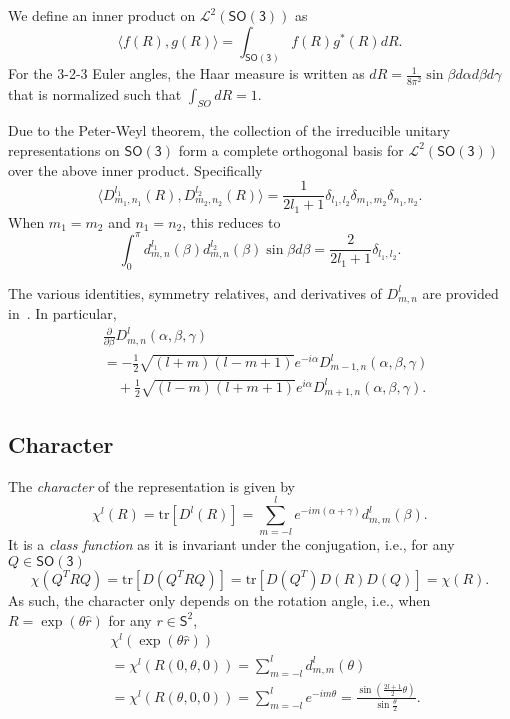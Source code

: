 \documentclass{ieeetran}
\newcommand{\pair}[1]{\ensuremath{\langle #1 \rangle}}
\newcommand{\trs}[1]{\mathrm{tr}\ensuremath{[#1]}}
\newcommand{\deriv}[2]{\ensuremath{\frac{\partial #1}{\partial #2}}}
\newcommand{\SO}{\ensuremath{\mathsf{SO(3)}}}
\newcommand{\Sph}{\ensuremath{\mathsf{S}}}
\begin{document}
We define an inner product on $\mathcal{L}^2(\SO)$ as
\[
\pair{f(R),g(R)}=\int_{\SO} f(R) g^*(R) dR.
\]
For the 3-2-3 Euler angles, the Haar measure is written as $dR = \frac{1}{8\pi^2}\sin\beta d\alpha d\beta d\gamma$ that is normalized such that $\int_{SO} dR = 1$. 

Due to the Peter-Weyl theorem, the collection of the irreducible unitary representations on $\SO$ form a complete orthogonal basis for $\mathcal{L}^2(\SO)$ over the above inner product. Specifically
\[
\pair{ D^{l_1}_{m_1,n_1}(R), D^{l_2}_{m_2,n_2}(R)} = \frac{1}{2l_1+1}\delta_{l_1,l_2}\delta_{m_1,m_2}\delta_{n_1,n_2}. 
\]
When $m_1=m_2$ and $n_1=n_2$, this reduces to
\[
\int_{0}^\pi d^{l_1}_{m,n}(\beta)d^{l_2}_{m,n}(\beta)\sin\beta d\beta = \frac{2}{2l_1+1}\delta_{l_1,l_2}. 
\]

The various identities, symmetry relatives, and derivatives of $D^{l}_{m,n}$ are provided in~\cite{VarMos88}. In particular,
\begin{align}
&\deriv{}{\beta} D^l_{m,n}(\alpha,\beta,\gamma)\nonumber\\
& = -\frac{1}{2}\sqrt{(l+m)(l-m+1)}e^{-i\alpha} D^l_{m-1,n}(\alpha,\beta,\gamma)\nonumber\\
& \quad + \frac{1}{2}\sqrt{(l-m)(l+m+1)}e^{i\alpha} D^l_{m+1,n}(\alpha,\beta,\gamma).\label{eqn:dD_dbeta}
\end{align}


\subsection{Character}

The \textit{character} of the representation is given by
\[
\chi^l(R) = \trs{D^l(R)}=\sum_{m=-l}^l e^{-im(\alpha+\gamma)} d^l_{m,m}(\beta).
\]
It is a \textit{class function} as it is invariant under the conjugation, i.e., for any $Q\in\SO$
\[
\chi(Q^T R Q) = \trs{D(Q^T R Q)}=\trs{D(Q^T)D(R)D(Q)}=\chi(R).
\]
As such, the character only depends on the rotation angle, i.e., when $R=\exp(\theta\hat r)$ for any $r\in\Sph^2$, 
\begin{align*}
&\chi^l(\exp(\theta\hat r))\\
&= \chi^l{(R(0,\theta,0))}= \sum_{m=-l}^l d^l_{m,m}(\theta)\\
&= \chi^l{(R(\theta,0,0))}= \sum_{m=-l}^l e^{-im\theta}
=\frac{\sin(\frac{2l+1}{2}\theta)}{\sin\frac{\theta}{2}}.
\end{align*}
\end{document}
